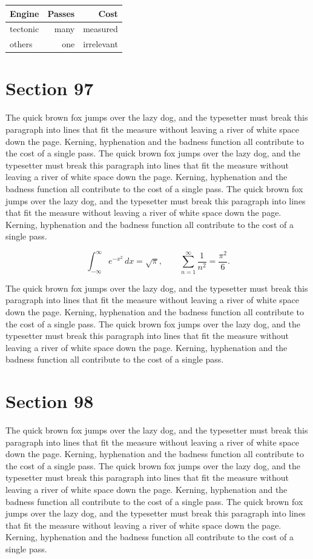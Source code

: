 \documentclass{article}
\begin{document}
\begin{center}
\begin{tabular}{lrr}
\toprule
Engine & Passes & Cost \\
\midrule
tectonic & many & measured \\
others & one & irrelevant \\
\bottomrule
\end{tabular}
\end{center}

\section{Section 97}
The quick brown fox jumps over the lazy dog, and the typesetter must break this paragraph into lines that fit the measure without leaving a river of white space down the page. Kerning, hyphenation and the badness function all contribute to the cost of a single pass. The quick brown fox jumps over the lazy dog, and the typesetter must break this paragraph into lines that fit the measure without leaving a river of white space down the page. Kerning, hyphenation and the badness function all contribute to the cost of a single pass. The quick brown fox jumps over the lazy dog, and the typesetter must break this paragraph into lines that fit the measure without leaving a river of white space down the page. Kerning, hyphenation and the badness function all contribute to the cost of a single pass. 

\begin{equation}
\int_{-\infty}^{\infty} e^{-x^{2}}\,dx = \sqrt{\pi}, \qquad
\sum_{n=1}^{\infty} \frac{1}{n^{2}} = \frac{\pi^{2}}{6}.
\end{equation}

The quick brown fox jumps over the lazy dog, and the typesetter must break this paragraph into lines that fit the measure without leaving a river of white space down the page. Kerning, hyphenation and the badness function all contribute to the cost of a single pass. The quick brown fox jumps over the lazy dog, and the typesetter must break this paragraph into lines that fit the measure without leaving a river of white space down the page. Kerning, hyphenation and the badness function all contribute to the cost of a single pass. 
\section{Section 98}
The quick brown fox jumps over the lazy dog, and the typesetter must break this paragraph into lines that fit the measure without leaving a river of white space down the page. Kerning, hyphenation and the badness function all contribute to the cost of a single pass. The quick brown fox jumps over the lazy dog, and the typesetter must break this paragraph into lines that fit the measure without leaving a river of white space down the page. Kerning, hyphenation and the badness function all contribute to the cost of a single pass. The quick brown fox jumps over the lazy dog, and the typesetter must break this paragraph into lines that fit the measure without leaving a river of white space down the page. Kerning, hyphenation and the badness function all contribute to the cost of a single pass. 
\end{document}
